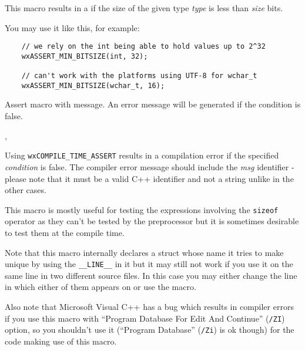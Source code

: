 This macro results in a
 if the size
of the given type {\it type} is less than {\it size} bits.

You may use it like this, for example:

\begin{verbatim}
    // we rely on the int being able to hold values up to 2^32
    wxASSERT_MIN_BITSIZE(int, 32);

    // can't work with the platforms using UTF-8 for wchar_t
    wxASSERT_MIN_BITSIZE(wchar_t, 16);
\end{verbatim}


\label{wxassertmsg}


Assert macro with message. An error message will be generated if the condition is false.


,\\


\label{wxcompiletimeassert}


Using {\tt wxCOMPILE\_TIME\_ASSERT} results in a compilation error if the
specified {\it condition} is false. The compiler error message should include
the {\it msg} identifier - please note that it must be a valid C++ identifier
and not a string unlike in the other cases.

This macro is mostly useful for testing the expressions involving the
{\tt sizeof} operator as they can't be tested by the preprocessor but it is
sometimes desirable to test them at the compile time.

Note that this macro internally declares a struct whose name it tries to make
unique by using the {\tt \_\_LINE\_\_} in it but it may still not work if you
use it on the same line in two different source files. In this case you may
either change the line in which either of them appears on or use the
 macro.

Also note that Microsoft Visual C++ has a bug which results in compiler errors
if you use this macro with ``Program Database For Edit And Continue''
(\texttt{/ZI}) option, so you shouldn't use it (``Program Database''
(\texttt{/Zi}) is ok though) for the code making use of this macro.

